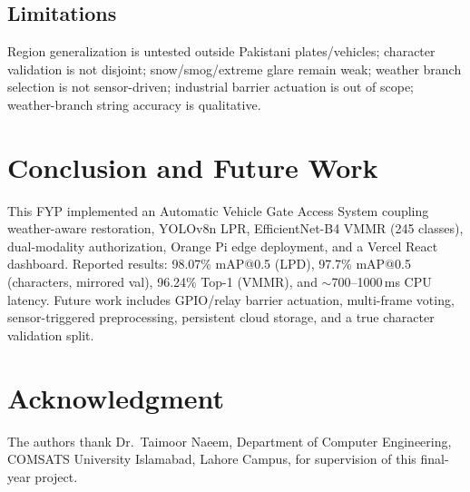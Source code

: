 \documentclass[10pt, conference]{IEEEtran}
\begin{document}
\subsection{Limitations}
Region generalization is untested outside Pakistani plates/vehicles; character validation is not disjoint; snow/smog/extreme glare remain weak; weather branch selection is not sensor-driven; industrial barrier actuation is out of scope; weather-branch string accuracy is qualitative.

\section{Conclusion and Future Work}
\label{sec:conc}
This FYP implemented an Automatic Vehicle Gate Access System coupling weather-aware restoration, YOLOv8n LPR, EfficientNet-B4 VMMR (245 classes), dual-modality authorization, Orange Pi edge deployment, and a Vercel React dashboard. Reported results: 98.07\% mAP@0.5 (LPD), 97.7\% mAP@0.5 (characters, mirrored val), 96.24\% Top-1 (VMMR), and $\sim$700--1000\,ms CPU latency. Future work includes GPIO/relay barrier actuation, multi-frame voting, sensor-triggered preprocessing, persistent cloud storage, and a true character validation split.

\section*{Acknowledgment}
The authors thank Dr.\ Taimoor Naeem, Department of Computer Engineering, COMSATS University Islamabad, Lahore Campus, for supervision of this final-year project.

\clearpage
\balance


\end{document}
